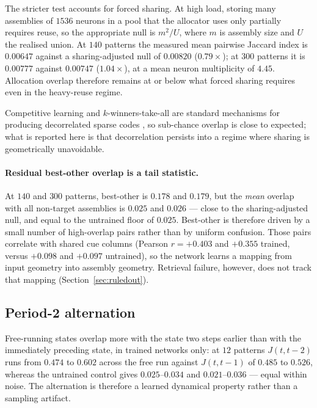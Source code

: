 \documentclass[10pt,twocolumn,a4paper]{article}
\begin{document}
The stricter test accounts for forced sharing. At high load, storing many assemblies of
$1536$ neurons in a pool that the allocator uses only partially requires reuse, so the
appropriate null is $m^{2}/U$, where $m$ is assembly size and $U$ the realised union. At
$140$ patterns the measured mean pairwise Jaccard index is $0.00647$ against a
sharing-adjusted null of $0.00820$ ($0.79\times$); at $300$ patterns it is $0.00777$
against $0.00747$ ($1.04\times$), at a mean neuron multiplicity of $4.45$. Allocation
overlap therefore remains at or below what forced sharing requires even in the heavy-reuse
regime.

Competitive learning and $k$-winners-take-all are standard mechanisms for producing
decorrelated sparse codes \cite{makhzani2015,sacouto2023}, so sub-chance overlap is close
to expected; what is reported here is that decorrelation persists into a regime where
sharing is geometrically unavoidable.

\paragraph{Residual best-other overlap is a tail statistic.}
At $140$ and $300$ patterns, best-other is $0.178$ and $0.179$, but the \emph{mean}
overlap with all non-target assemblies is $0.025$ and $0.026$ --- close to the
sharing-adjusted null, and equal to the untrained floor of $0.025$. Best-other is
therefore driven by a small number of high-overlap pairs rather than by uniform confusion.
Those pairs correlate with shared cue columns (Pearson $r = +0.403$ and $+0.355$ trained,
versus $+0.098$ and $+0.097$ untrained), so the network learns a mapping from input
geometry into assembly geometry. Retrieval failure, however, does not track that mapping
(Section~\ref{sec:ruledout}).

\subsection{Period-2 alternation}
\label{sec:period2}

Free-running states overlap more with the state two steps earlier than with the
immediately preceding state, in trained networks only: at $12$ patterns $J(t,t{-}2)$ runs
from $0.474$ to $0.602$ across the free run against $J(t,t{-}1)$ of $0.485$ to $0.526$,
whereas the untrained control gives $0.025$--$0.034$ and $0.021$--$0.036$ --- equal within
noise. The alternation is therefore a learned dynamical property rather than a sampling
artifact.
\end{document}
